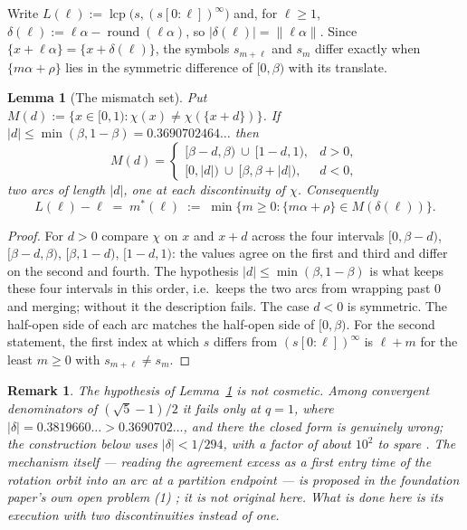 \documentclass[11pt]{article}
\newtheorem{lemma}[theorem]{Lemma}
\newtheorem*{remark}{Remark}
\begin{document}
Write $L(\ell):=\operatorname{lcp}\bigl(s,(s[0{:}\ell])^\infty\bigr)$ and, for $\ell\ge1$,
$\delta(\ell):=\ell\alpha-\operatorname{round}(\ell\alpha)$, so $|\delta(\ell)|=\lVert\ell\alpha\rVert$.
Since $\{x+\ell\alpha\}=\{x+\delta(\ell)\}$, the symbols $s_{m+\ell}$ and $s_m$ differ exactly when
$\{m\alpha+\rho\}$ lies in the symmetric difference of $[0,\beta)$ with its translate.

\begin{lemma}[The mismatch set]
\label{lem:mismatch}
Put $M(d):=\{x\in[0,1):\chi(x)\ne\chi(\{x+d\})\}$. If $|d|\le\min(\beta,1-\beta)=0.3690702464\ldots$
then
\[
  M(d)=\begin{cases}[\beta-d,\beta)\ \cup\ [1-d,1), & d>0,\\[2pt]
                    [0,|d|)\ \cup\ [\beta,\beta+|d|), & d<0,\end{cases}
\]
two arcs of length $|d|$, one at each discontinuity of $\chi$. Consequently
\[
  L(\ell)-\ell \;=\; m^*(\ell)\;:=\;\min\{m\ge0:\{m\alpha+\rho\}\in M(\delta(\ell))\}.
\]
\end{lemma}

\begin{proof}
For $d>0$ compare $\chi$ on $x$ and $x+d$ across the four intervals
$[0,\beta-d)$, $[\beta-d,\beta)$, $[\beta,1-d)$, $[1-d,1)$: the values agree on the first and third
and differ on the second and fourth. The hypothesis $|d|\le\min(\beta,1-\beta)$ is what keeps these
four intervals in this order, i.e.\ keeps the two arcs from wrapping past $0$ and merging; without
it the description fails. The case $d<0$ is symmetric. The half-open side of each arc matches the
half-open side of $[0,\beta)$. For the second statement, the first index at which $s$ differs from
$(s[0{:}\ell])^\infty$ is $\ell+m$ for the least $m\ge0$ with $s_{m+\ell}\ne s_m$.
\end{proof}

\begin{remark}
The hypothesis of Lemma~\ref{lem:mismatch} is not cosmetic. Among convergent denominators of
$(\sqrt5-1)/2$ it fails only at $q=1$, where $|\delta|=0.3819660\ldots>0.3690702\ldots$, and there
the closed form is genuinely wrong; the construction below uses $|\delta|<1/294$, with a factor of
about $10^2$ to spare \cite{Phase11bAudit}. The mechanism itself --- reading the agreement excess as a
first entry time of the rotation orbit into an arc at a partition endpoint --- is proposed in the
foundation paper's own open problem (1) \cite{DeJesus2026Sturmian}; it is not original here. What is
done here is its execution with \emph{two} discontinuities instead of one.
\end{remark}
\end{document}
